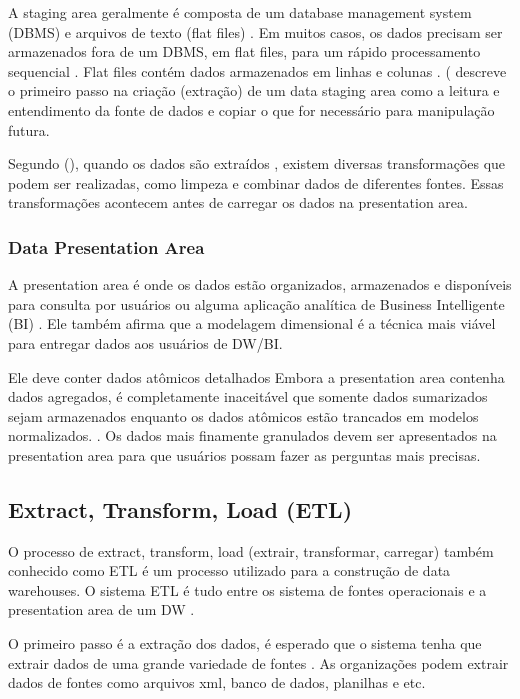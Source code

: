 A staging area geralmente é composta de um database management system (DBMS) e arquivos de texto (flat files) \citep[p. 35]{jmj}. Em muitos casos, os dados precisam ser armazenados fora de um DBMS, em flat files, para um rápido processamento sequencial \citep[p. 35]{jmj}. Flat files contém dados armazenados em linhas e colunas \citep[p. 36]{jmj}.
\citeauthor{rk} (\citeyear[8]{rk} descreve o primeiro passo na criação (extração) de um data staging area como a leitura e entendimento da fonte de dados e copiar o que for necessário para manipulação futura.

Segundo \citeauthor{rk} (\citeyear[8]{rk}), quando os dados são extraídos , existem diversas transformações que podem ser realizadas, como limpeza e combinar dados de diferentes fontes. Essas transformações acontecem antes de carregar os dados na presentation area.

\subsubsection{Data Presentation Area}
A presentation area é onde os dados estão organizados, armazenados e disponíveis para consulta por usuários ou alguma aplicação analítica de Business Intelligente (BI) \citep[21]{rk}. Ele também afirma que a modelagem dimensional é a técnica mais viável para entregar dados aos usuários de DW/BI.

Ele deve conter dados atômicos detalhados \citep[21]{rk}  Embora a presentation area contenha dados agregados, é completamente inaceitável que somente dados sumarizados sejam armazenados enquanto os dados atômicos estão trancados em modelos normalizados. \citep[21]{rk}. Os dados mais finamente granulados devem ser apresentados na presentation area para que usuários possam fazer as perguntas mais precisas.

\subsection{Extract, Transform, Load (ETL)}
O processo de extract, transform, load (extrair, transformar, carregar) também conhecido como ETL é um processo utilizado para a construção de data warehouses. O sistema ETL é tudo entre os sistema de fontes operacionais e a presentation area de um DW \citep[19]{rk}. 

O primeiro passo é a extração dos dados, é esperado que o sistema tenha que extrair dados de uma grande variedade de fontes \citep[453]{rk}. As organizações podem extrair dados de fontes como arquivos xml, banco de dados, planilhas e etc.

